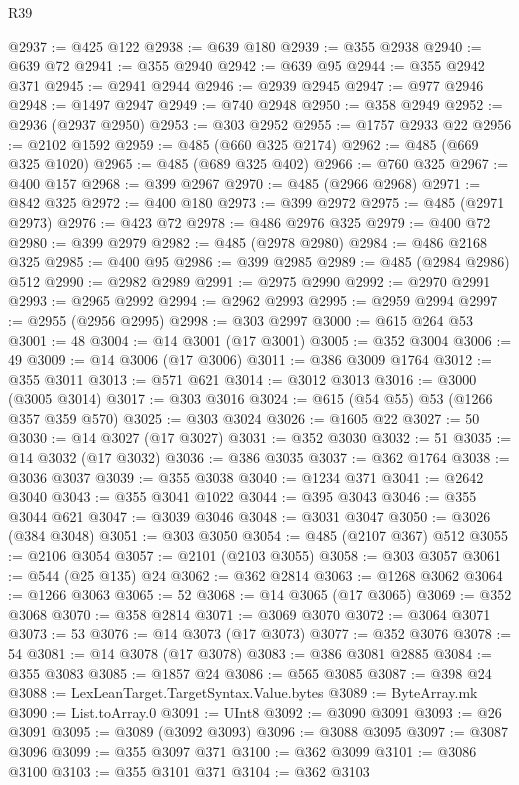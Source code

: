 \begin{lexlean}{R39}
\begin{coremodule}
@2937 := @425 @122
@2938 := @639 @180
@2939 := @355 @2938
@2940 := @639 @72
@2941 := @355 @2940
@2942 := @639 @95
@2944 := @355 @2942 @371
@2945 := @2941 @2944
@2946 := @2939 @2945
@2947 := @977 @2946
@2948 := @1497 @2947
@2949 := @740 @2948
@2950 := @358 @2949
@2952 := @2936 (@2937 @2950)
@2953 := @303 @2952
@2955 := @1757 @2933 @22
@2956 := @2102 @1592
@2959 := @485 (@660 @325 @2174)
@2962 := @485 (@669 @325 @1020)
@2965 := @485 (@689 @325 @402)
@2966 := @760 @325
@2967 := @400 @157
@2968 := @399 @2967
@2970 := @485 (@2966 @2968)
@2971 := @842 @325
@2972 := @400 @180
@2973 := @399 @2972
@2975 := @485 (@2971 @2973)
@2976 := @423 @72
@2978 := @486 @2976 @325
@2979 := @400 @72
@2980 := @399 @2979
@2982 := @485 (@2978 @2980)
@2984 := @486 @2168 @325
@2985 := @400 @95
@2986 := @399 @2985
@2989 := @485 (@2984 @2986) @512
@2990 := @2982 @2989
@2991 := @2975 @2990
@2992 := @2970 @2991
@2993 := @2965 @2992
@2994 := @2962 @2993
@2995 := @2959 @2994
@2997 := @2955 (@2956 @2995)
@2998 := @303 @2997
@3000 := @615 @264 @53
@3001 := 48
@3004 := @14 @3001 (@17 @3001)
@3005 := @352 @3004
@3006 := 49
@3009 := @14 @3006 (@17 @3006)
@3011 := @386 @3009 @1764
@3012 := @355 @3011
@3013 := @571 @621
@3014 := @3012 @3013
@3016 := @3000 (@3005 @3014)
@3017 := @303 @3016
@3024 := @615 (@54 @55) @53 (@1266 @357 @359 @570)
@3025 := @303 @3024
@3026 := @1605 @22
@3027 := 50
@3030 := @14 @3027 (@17 @3027)
@3031 := @352 @3030
@3032 := 51
@3035 := @14 @3032 (@17 @3032)
@3036 := @386 @3035
@3037 := @362 @1764
@3038 := @3036 @3037
@3039 := @355 @3038
@3040 := @1234 @371
@3041 := @2642 @3040
@3043 := @355 @3041 @1022
@3044 := @395 @3043
@3046 := @355 @3044 @621
@3047 := @3039 @3046
@3048 := @3031 @3047
@3050 := @3026 (@384 @3048)
@3051 := @303 @3050
@3054 := @485 (@2107 @367) @512
@3055 := @2106 @3054
@3057 := @2101 (@2103 @3055)
@3058 := @303 @3057
@3061 := @544 (@25 @135) @24
@3062 := @362 @2814
@3063 := @1268 @3062
@3064 := @1266 @3063
@3065 := 52
@3068 := @14 @3065 (@17 @3065)
@3069 := @352 @3068
@3070 := @358 @2814
@3071 := @3069 @3070
@3072 := @3064 @3071
@3073 := 53
@3076 := @14 @3073 (@17 @3073)
@3077 := @352 @3076
@3078 := 54
@3081 := @14 @3078 (@17 @3078)
@3083 := @386 @3081 @2885
@3084 := @355 @3083
@3085 := @1857 @24
@3086 := @565 @3085
@3087 := @398 @24
@3088 := LexLeanTarget.TargetSyntax.Value.bytes
@3089 := ByteArray.mk
@3090 := List.toArray.{0}
@3091 := UInt8
@3092 := @3090 @3091
@3093 := @26 @3091
@3095 := @3089 (@3092 @3093)
@3096 := @3088 @3095
@3097 := @3087 @3096
@3099 := @355 @3097 @371
@3100 := @362 @3099
@3101 := @3086 @3100
@3103 := @355 @3101 @371
@3104 := @362 @3103

\end{coremodule}
\end{lexlean}
